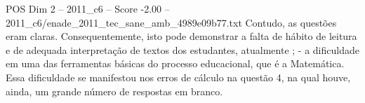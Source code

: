 \begin{textsample}{POS Dim 2 – 2011\_c6 – Score -2.00 – 2011\_c6/enade\_2011\_tec\_sane\_amb\_4989e09b77.txt}
Contudo, as questões eram claras.
Consequentemente, isto pode demonstrar a falta de hábito de leitura e de adequada interpretação de textos dos estudantes, atualmente ; - a dificuldade em uma das ferramentas básicas do processo educacional, que é a Matemática.
Essa dificuldade se manifestou nos erros de cálculo na questão 4, na qual houve, ainda, um grande número de respostas em branco.

\end{textsample}
